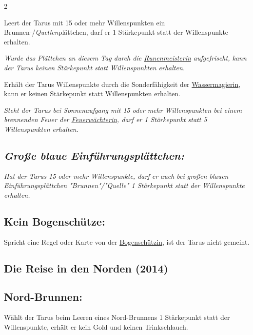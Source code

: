 \documentclass[10pt, a4paper, oneside]{book}
\newcommand{\fan}[1]{\textit{#1}}
\begin{document}
\begin{multicols*}{2}
\begin{nobgcolor}
Leert der Tarus mit 15 oder mehr Willenspunkten ein Brunnen-/\fan{Quellen}plättchen, darf er 1 Stärkepunkt statt der Willenspunkte erhalten.

\fan{Wurde das Plättchen an diesem Tag durch die \hyperref[runenmeisterin]{Runenmeisterin} aufgefrischt, kann der Tarus keinen Stärkepunkt statt Willenspunkten erhalten.}
\supercite{137438}

Erhält der Tarus Willenspunkte durch die Sonderfähigkeit der \hyperref[wassermagierin]{Wassermagierin}, kann er keinen Stärkepunkt statt Willenspunkten erhalten.

\fan{Steht der Tarus bei Sonnenaufgang mit 15 oder mehr Willenspunkten bei einem brennenden Feuer der \hyperref[feuerwaechterin]{Feuerwächterin}, darf er 1 Stärkepunkt statt 5 Willenspunkten erhalten.}




\subsection{\fan{Große blaue Einführungsplättchen:}}

\fan{Hat der Tarus 15 oder mehr Willenspunkte, darf er auch bei großen blauen Einführungsplättchen "Brunnen"/"Quelle" 1 Stärkepunkt statt der Willenspunkte erhalten.}




\subsection{Kein Bogenschütze:}

Spricht eine Regel oder Karte von der \hyperref[bogenschuetzin]{Bogenschützin}, ist der Tarus nicht gemeint.




\end{nobgcolor}







\begin{bgcolor}
\section{Die Reise in den Norden (2014)}


\subsection{Nord-Brunnen:}

Wählt der Tarus beim Leeren eines Nord-Brunnens 1 Stärkepunkt statt der Willenspunkte, erhält er kein Gold und keinen Trinkschlauch.
\supercite{dridn-begleitheft}


\end{bgcolor}
\end{multicols*}
\end{document}

